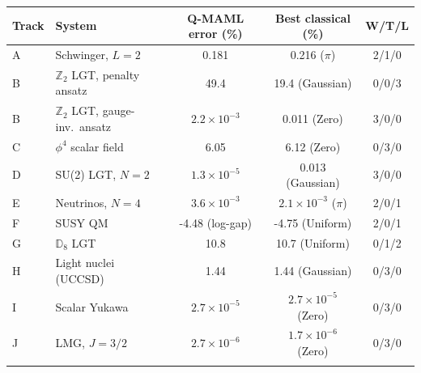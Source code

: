 \begin{tabular}{@{}llccc@{}}
\toprule
Track & System & Q-MAML error (\%) & Best classical (\%) & W/T/L \\
\midrule
A & Schwinger, $L{=}2$ & 0.181 & 0.216 ($\pi$) & 2/1/0 \\
B & $\mathbb{Z}_2$ LGT, penalty ansatz & 49.4 & 19.4 (Gaussian) & 0/0/3 \\
B & $\mathbb{Z}_2$ LGT, gauge-inv.\ ansatz & $2.2\!\times\!10^{-3}$ & 0.011 (Zero) & 3/0/0 \\
C & $\phi^4$ scalar field & 6.05 & 6.12 (Zero) & 0/3/0 \\
D & SU(2) LGT, $N{=}2$ & $1.3\!\times\!10^{-5}$ & 0.013 (Gaussian) & 3/0/0 \\
E & Neutrinos, $N{=}4$ & $3.6\!\times\!10^{-3}$ & $2.1\!\times\!10^{-3}$ ($\pi$) & 2/0/1 \\
F & SUSY QM & -4.48 (log-gap) & -4.75 (Uniform) & 2/0/1 \\
G & $\mathbb{D}_8$ LGT & 10.8 & 10.7 (Uniform) & 0/1/2 \\
H & Light nuclei (UCCSD) & 1.44 & 1.44 (Gaussian) & 0/3/0 \\
I & Scalar Yukawa & $2.7\!\times\!10^{-5}$ & $2.7\!\times\!10^{-5}$ (Zero) & 0/3/0 \\
J & LMG, $J{=}3/2$ & $2.7\!\times\!10^{-6}$ & $1.7\!\times\!10^{-6}$ (Zero) & 0/3/0 \\
\botrule
\end{tabular}
